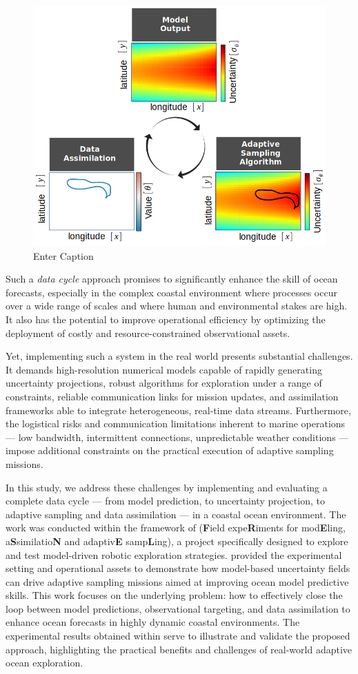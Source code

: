\begin{figure}
    \centering
    \includegraphics[width=.7\linewidth]{fig/data_cycle.png}
    \caption{Enter Caption}
    \label{fig:enter-label}
\end{figure}

Such a \textit{data cycle} approach promises to significantly enhance
the skill of ocean forecasts, especially in the complex coastal
environment where processes occur over a wide range of scales and where
human and environmental stakes are high. It also has the potential to
improve operational efficiency by optimizing the deployment of costly
and resource-constrained observational assets.

Yet, implementing such a system in the real world presents substantial
challenges. It demands high-resolution numerical models capable of
rapidly generating uncertainty projections, robust algorithms for
exploration under a range of constraints, reliable communication links
for mission updates, and assimilation frameworks able to integrate
heterogeneous, real-time data streams. Furthermore, the logistical risks
and communication limitations inherent to marine operations — low
bandwidth, intermittent connections, unpredictable weather conditions —
impose additional constraints on the practical execution of adaptive
sampling missions.

In this study, we address these challenges by implementing and
evaluating a complete data cycle — from model prediction, to uncertainty
projection, to adaptive sampling and data assimilation — in a coastal
ocean environment. The work was conducted within the framework of \proj
(\textbf{F}ield expe\textbf{R}iments for mod\textbf{E}ling,
a\textbf{S}similatio\textbf{N} and adaptiv\textbf{E} samp\textbf{L}ing),
a project specifically designed to explore and test model-driven robotic
exploration strategies. \proj provided the experimental setting and
operational assets to demonstrate how model-based uncertainty fields can
drive adaptive sampling missions aimed at improving ocean model
predictive skills. This work focuses on the underlying problem: how to
effectively close the loop between model predictions, observational
targeting, and data assimilation to enhance ocean forecasts in highly
dynamic coastal environments. The experimental results obtained within
\proj serve to illustrate and validate the proposed approach,
highlighting the practical benefits and challenges of real-world
adaptive ocean exploration.


